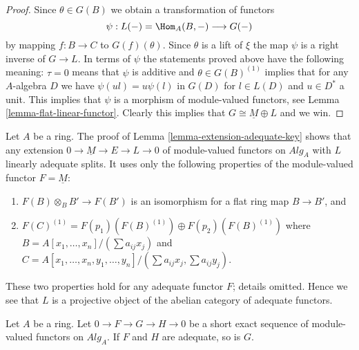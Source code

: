 \begin{proof}
\medskip\noindent
Since $\theta \in G(B)$ we obtain a transformation of functors
$$
\psi : L(-) = \Hom_A(B, - ) \longrightarrow G(-)
$$
by mapping $f : B \to C$ to $G(f)(\theta)$. Since $\theta$ is a lift of
$\xi$ the map $\psi$ is a right inverse of $G \to L$. In terms of
$\psi$ the statements proved above have the following meaning:
$\tau = 0$ means that $\psi$ is additive and
$\theta \in G(B)^{(1)}$ implies that for any $A$-algebra $D$ we have
$\psi(ul) = u\psi(l)$ in $G(D)$ for $l \in L(D)$ and $u \in D^*$ a unit.
This implies that $\psi$ is a morphism of module-valued functors, see
Lemma \ref{lemma-flat-linear-functor}.
Clearly this implies that $G \cong \underline{M} \oplus L$ and we win.
\end{proof}

\begin{remark}
\label{remark-linearly-adequate}
Let $A$ be a ring.
The proof of
Lemma \ref{lemma-extension-adequate-key}
shows that any extension $0 \to \underline{M} \to E \to L \to 0$
of module-valued functors on $\textit{Alg}_A$
with $L$ linearly adequate splits. It uses only the following properties
of the module-valued functor $F = \underline{M}$:
\begin{enumerate}
\item $F(B) \otimes_B B' \to F(B')$ is an isomorphism
for a flat ring map $B \to B'$, and
\item
$F(C)^{(1)} = F(p_1)(F(B)^{(1)}) \oplus F(p_2)(F(B)^{(1)})$
where $B = A[x_1, \ldots, x_n]/(\sum a_{ij}x_j)$ and
$C = A[x_1, \ldots, x_n, y_1, \ldots, y_n]/
(\sum a_{ij}x_j, \sum a_{ij}y_j)$.
\end{enumerate}
These two properties hold for any adequate functor $F$; details omitted.
Hence we see that $L$ is a projective object of the abelian category of
adequate functors.
\end{remark}

\begin{lemma}
\label{lemma-extension-adequate}
Let $A$ be a ring.
Let $0 \to F \to G \to H \to 0$ be a short exact sequence of
module-valued functors on $\textit{Alg}_A$.
If $F$ and $H$ are adequate, so is $G$.
\end{lemma}

